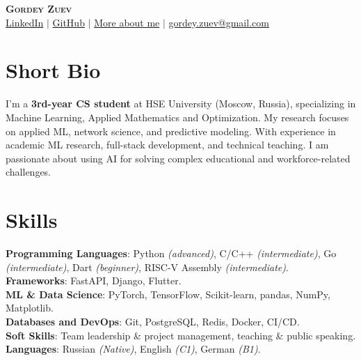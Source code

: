 \documentclass[letterpaper,11pt]{article}
\begin{document}
\begin{center}
    \textsc{\Huge{\textbf{Gordey Zuev}}} \\ \vspace{1pt}
    \href{{https://www.linkedin.com/in/gordey-zuev/}}{\textcolor{blue!50!black}{LinkedIn}} $|$
    \href{https://github.com/GordeyZuev}{\textcolor{blue!50!black}{GitHub}} $|$
    \href{http://gordeyzuev.notion.site}{\textcolor{blue!50!black}{More about me}} $|$
    \href{mailto:gordey.zuev@gmail.com}{\textcolor{blue!50!black}{gordey.zuev@gmail.com}}
\end{center}


\section{Short Bio}
 \begin{itemize}[leftmargin=0.15in, label={}]
    \small{\item{
     {I’m a \textbf{3rd-year CS student} at HSE University (Moscow, Russia), specializing in Machine Learning, Applied Mathematics and Optimization. My research focuses on applied ML, network science, and predictive modeling. With experience in academic ML research, full-stack development, and technical teaching. I am passionate about using AI for solving complex educational and workforce-related challenges.}}}
 \end{itemize}


\section{Skills}
 \begin{itemize}[leftmargin=0.15in, label={}]
    \small{\item{
     \textbf{Programming Languages}{: Python \textit{(advanced)}, C/C++ \textit{(intermediate)}, Go \textit{(intermediate)}, Dart \textit{(beginner)}, RISC-V Assembly \textit{(intermediate)}.} \\
     
     \textbf{Frameworks}{: FastAPI, Django, Flutter.} \\
     
     \textbf{ML \& Data Science}{: PyTorch, TensorFlow, Scikit-learn, pandas, NumPy, Matplotlib.} \\
     
     \textbf{Databases and DevOps}{: Git, PostgreSQL, Redis, Docker, CI/CD.} \\
     
     \textbf{Soft Skills}{: Team leadership \& project management, teaching \& public speaking.} \\
     \textbf{Languages}{: Russian \textit{(Native)}, English \textit{(C1)}, German \textit{(B1)}.}
    }}
 \end{itemize}
\end{document}
